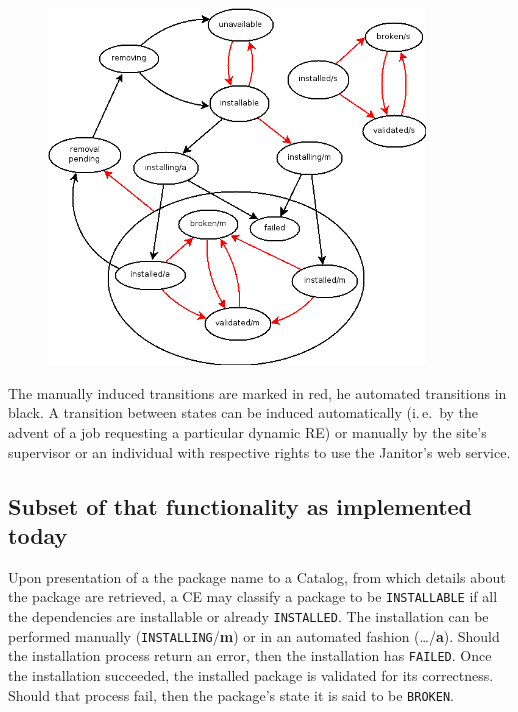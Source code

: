 \begin{figure}[!h]
  \begin{center}
    \includegraphics[width=10cm]{images/RE_states.png}
    \label{fig:RE_states}
  \end{center}
\end{figure}
 
The manually induced transitions are marked in red, he automated transitions in black.
A transition between states can be induced automatically (i.\,e.\ by the
advent of a job requesting a particular dynamic RE) or manually by the
site's supervisor or an individual with respective rights to use the
Janitor's web service.

\subsection{Subset of that functionality as implemented today}
Upon presentation of a the package name to a Catalog, from which details about
the package are retrieved, a CE may
classify a package to be \texttt{INSTALLABLE} if all the dependencies
are installable or already \texttt{INSTALLED}. The installation can be
performed manually (\texttt{INSTALLING}/{\bf m}) or in an automated fashion
(\ldots/{\bf a}). Should the installation process return an error, then
the installation has \texttt{FAILED}. Once the installation succeeded,
the installed package is validated for its correctness. Should that
process fail, then the package's state it is said to be \texttt{BROKEN}.

